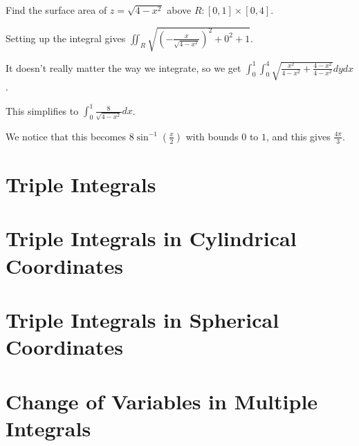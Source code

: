 \documentclass[../calc3.tex]{subfiles}
\begin{document}
\begin{example}
    Find the surface area of $z=\sqrt{4-x^2}$ above $R: [0,1]\times [0,4]$.

    Setting up the integral gives $\iint_R \sqrt{\left(-\frac{x}{\sqrt{4-x^2}}\right)^2+0^2+1}$.

    It doesn't really matter the way we integrate, so we get $\int_0^1 \int_0^4 \sqrt{\frac{x^2}{4-x^2}+\frac{4-x^2}{4-x^2}}dydx$.

    This simplifies to $\int_0^1 \frac{8}{\sqrt{4-x^2}}dx$.

    We notice that this becomes $8\sin^{-1}\left(\frac{x}{2}\right)$ with bounds $0$ to $1$, and this gives $\frac{4\pi}{3}$.
\end{example}

\section{Triple Integrals}

\section{Triple Integrals in Cylindrical Coordinates}

\section{Triple Integrals in Spherical Coordinates}

\section{Change of Variables in Multiple Integrals}
\end{document}
